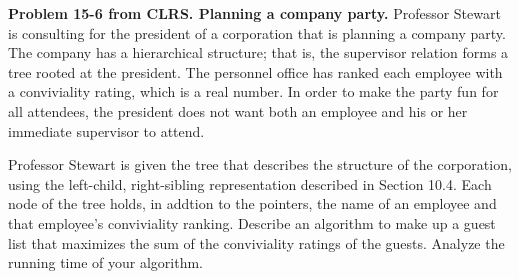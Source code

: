 \documentclass[11pt,letterpaper]{article}
\begin{document}
\noindent
\textbf{Problem 15-6 from CLRS. Planning a company party.} 
Professor Stewart is consulting for the president of a
corporation that is planning a company party. The company
has a hierarchical structure; that is, the supervisor
relation forms a tree rooted at the president. The personnel
office has ranked each employee with a conviviality rating,
which is a real number. In order to make the party fun for
all attendees, the president does not want both an employee
and his or her immediate supervisor to attend.

Professor Stewart is given the tree that describes the
structure of the corporation, using the left-child,
right-sibling representation described in Section 10.4. Each
node of the tree holds, in addtion to the pointers, the name
of an employee and that employee's conviviality ranking.
Describe an algorithm to make up a guest list that maximizes
the sum of the conviviality ratings of the guests. Analyze
the running time of your algorithm. 
\end{document}
